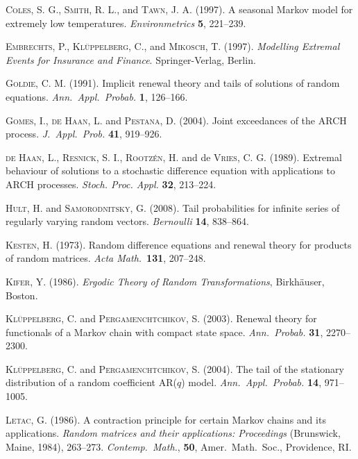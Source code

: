 \documentclass{aptpubarxiv}
\numberwithin{equation}{section}
\begin{document}
\begin{thebibliography}{}
\textsc{Coles, S. G.}, \textsc{Smith, R. L.}, and \textsc{Tawn, J. A.} (1997). A seasonal Markov model for extremely low temperatures. {\em Environmetrics\/} {\bf 5}, 221--239.

\textsc{Embrechts, P.}, \textsc{Kl\"uppelberg, C.}, and \textsc{Mikosch, T.} (1997). {\em Modelling Extremal Events for Insurance and Finance\/}. Springer-Verlag, Berlin.

\textsc{Goldie, C. M.} (1991). Implicit renewal theory and tails of solutions of random equations. {\em Ann.\ Appl.\ Probab.\/} {\bf 1}, 126--166.

\textsc{Gomes, I.}, \textsc{de Haan, L.} and \textsc{Pestana, D.} (2004). Joint exceedances of the ARCH process. {\em J.\ Appl.\ Prob.\/} {\bf 41}, 919--926.

\textsc{de Haan, L.}, \textsc{Resnick, S. I.}, \textsc{Rootz\'en, H.} and de \textsc{Vries, C. G.} (1989). Extremal behaviour of solutions to a stochastic difference equation with applications to ARCH processes. {\em Stoch. Proc. Appl.\/} {\bf 32}, 213--224.

\textsc{Hult, H.} and \textsc{Samorodnitsky, G.} (2008). Tail probabilities for infinite series of regularly varying random vectors. {\em Bernoulli} {\bf 14}, 838--864.

\textsc{Kesten, H.} (1973). Random difference equations and renewal theory for products of random matrices. {\em Acta Math.}\ {\bf 131}, 207--248.

\textsc{Kifer, Y.} (1986). {\em Ergodic Theory of Random Transformations}, Birkh\"{a}user, Boston.

\textsc{Kl\"uppelberg, C.} and \textsc{Pergamenchtchikov, S.} (2003). Renewal theory for functionals of a Markov chain with compact state space. {\em Ann.\ Probab.\/} {\bf 31}, 2270--2300.

\textsc{Kl\"uppelberg, C.} and \textsc{Pergamenchtchikov, S.} (2004). The tail of the stationary distribution of a random coefficient AR($q$) model. {\em Ann.\ Appl.\ Probab.\/} {\bf 14}, 971--1005.

\textsc{Letac, G.} (1986). A contraction principle for certain Markov chains and its applications. \emph{Random matrices and their applications: Proceedings} (Brunswick, Maine, 1984), 263--273. \emph{Contemp.\ Math.\/}, {\bf 50}, Amer.\ Math.\ Soc., Providence, RI.


\end{thebibliography}
\end{document}
